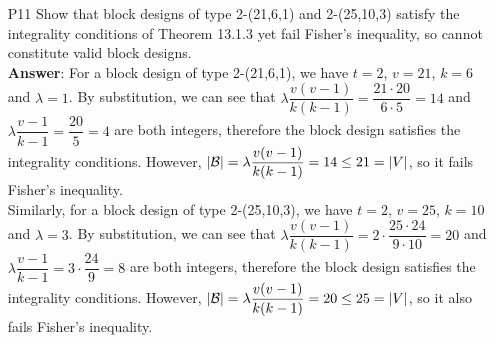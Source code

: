 \documentclass{article}
\begin{document}
\begin{itemize}
\begin{itemize}
          \end{itemize}
    \item [P11] Show that block designs of type 2-(21,6,1) and 2-(25,10,3) satisfy the integrality conditions of Theorem 13.1.3 yet fail Fisher's inequality, so cannot constitute valid block designs.\\
          \textbf{Answer}: For a block design of type 2-(21,6,1), we have $t=2$, $v=21$, $k=6$ and $\lambda=1$. By substitution, we can see that $\lambda\dfrac{v(v-1)}{k(k-1)}=\dfrac{21\cdot 20}{6\cdot 5}=14$ and $\lambda\dfrac{v-1}{k-1}=\dfrac{20}{5}=4$ are both integers, therefore the block design satisfies the integrality conditions. However, $\abs{\mathcal{B}}=\lambda\dfrac{v(v-1)}{k(k-1)}=14\leq 21=\abs{V}$, so it fails Fisher's inequality.\\
          Similarly, for a block design of type 2-(25,10,3), we have $t=2$, $v=25$, $k=10$ and $\lambda=3$. By substitution, we can see that $\lambda\dfrac{v(v-1)}{k(k-1)}=2\cdot\dfrac{25\cdot 24}{9\cdot 10}=20$ and $\lambda\dfrac{v-1}{k-1}=3\cdot\dfrac{24}{9}=8$ are both integers, therefore the block design satisfies the integrality conditions. However, $\abs{\mathcal{B}}=\lambda\dfrac{v(v-1)}{k(k-1)}=20\leq 25=\abs{V}$, so it also fails Fisher's inequality.
\end{itemize}
\end{document}
